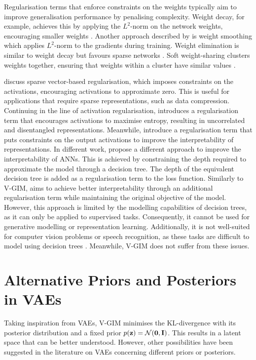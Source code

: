 	Regularisation terms that enforce constraints on the weights typically aim to improve generalisation performance by penalising complexity. Weight decay, for example, achieves this by applying the $L^2$-norm on the network weights, encouraging smaller weights \citep{gneccoWeightdecayTechniqueLearning2009}. Another approach described by \cite{kukackaRegularizationDeepLearning2017} is weight smoothing which applies $L^2$-norm to the gradients during training. Weight elimination is similar to weight decay but favours sparse networks \citep{weigendGeneralizationWeightEliminationApplication1990}. Soft weight-sharing clusters weights together, ensuring that weights within a cluster have similar values \citep{nowlanSimplifyingNeuralNetworks1992}.
	
	\cite{tianComprehensiveSurveyRegularization2022} discuss sparse vector-based regularisation, which imposes constraints on the activations, encouraging activations to approximate zero. This is useful for applications that require sparse representations, such as data compression. Continuing in the line of activation regularisation, \cite{tomczakLearningInformativeFeatures2016} introduces a regularisation term that encourages activations to maximise entropy, resulting in uncorrelated and disentangled representations. Meanwhile, \cite{wuImprovingInterpretabilityRegularization2018} introduce a regularisation term that puts constraints on the output activations to improve the interpretability of representations. In different work, \cite{wuOptimizingInterpretabilityDeep2021} propose a different approach to improve the interpretability of ANNs. This is achieved by constraining the depth required to approximate the model through a decision tree. The depth of the equivalent decision tree is added as a regularisation term to the loss function. Similarly to V-GIM, \citeauthor{wuOptimizingInterpretabilityDeep2021} aims to achieve better interpretability through an additional regularisation term while maintaining the original objective of the model. However, this approach is limited by the modelling capabilities of decision trees, as it can only be applied to supervised tasks. Consequently, it cannot be used for generative modelling or representation learning. Additionally, it is not well-suited for computer vision problems or speech recognition, as these tasks are difficult to model using decision trees \citep{stanfordmedaiMedAI34Optimizing2022}. Meanwhile, V-GIM does not suffer from these issues.
	
	

\section{Alternative Priors and Posteriors in VAEs} \label{cha:rel_alt_priors}
	Taking inspiration from VAEs, V-GIM minimises the KL-divergence with its posterior distribution and a fixed prior $p(\mathbf{z})=\mathcal{N}(\bm{\mathbf{0}}, \mathbf{I})$. This results in a latent space that can be better understood. However, other possibilities have been suggested in the literature on VAEs concerning different priors or posteriors.
	
